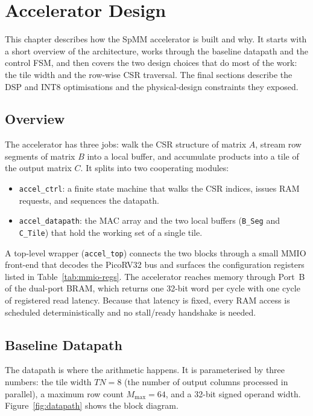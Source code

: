 \chapter{Accelerator Design}
\label{ch:design}

This chapter describes how the SpMM accelerator is built and why. It starts
with a short overview of the architecture, works through the baseline
datapath and the control FSM, and then covers the two design choices that do
most of the work: the tile width and the row-wise CSR traversal. The final
sections describe the DSP and INT8 optimisations and the physical-design
constraints they exposed.

\section{Overview}

The accelerator has three jobs: walk the CSR structure of matrix $A$, stream
row segments of matrix $B$ into a local buffer, and accumulate products into
a tile of the output matrix $C$. It splits into two cooperating modules:

\begin{itemize}
  \item \texttt{accel\_ctrl}: a finite state machine that walks the CSR
        indices, issues RAM requests, and sequences the datapath.
  \item \texttt{accel\_datapath}: the MAC array and the two local buffers
        (\texttt{B\_Seg} and \texttt{C\_Tile}) that hold the working set of
        a single tile.
\end{itemize}

A top-level wrapper (\texttt{accel\_top}) connects the two blocks through a
small MMIO front-end that decodes the PicoRV32 bus and surfaces the
configuration registers listed in Table~\ref{tab:mmio-regs}. The accelerator
reaches memory through Port~B of the dual-port BRAM, which returns one
32-bit word per cycle with one cycle of registered read latency. Because
that latency is fixed, every RAM access is scheduled deterministically and
no stall/ready handshake is needed.

\section{Baseline Datapath}

The datapath is where the arithmetic happens. It is parameterised by three
numbers: the tile width $TN = 8$ (the number of output columns processed in
parallel), a maximum row count $M_{\mathrm{max}} = 64$, and a 32-bit signed
operand width. Figure~\ref{fig:datapath} shows the block diagram.

